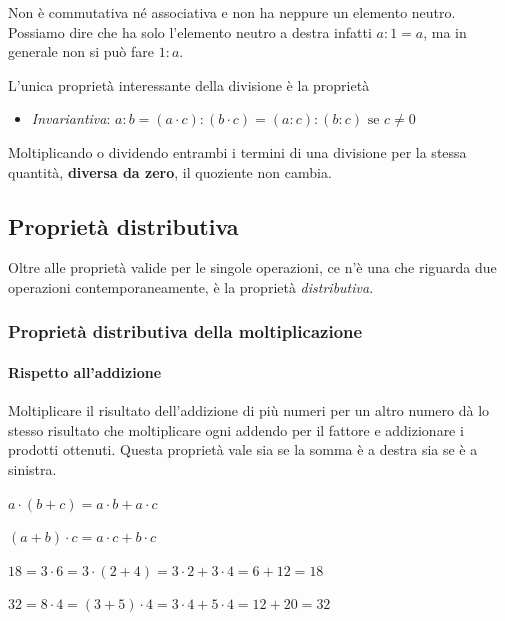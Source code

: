 Non è commutativa né associativa e non ha neppure un elemento neutro.
Possiamo dire che ha solo l'elemento neutro a destra infatti \(a : 1 = a\), 
ma in generale non si può fare \(1 : a\).

L'unica proprietà interessante della divisione è la proprietà
\begin{itemize} [noitemsep]
 \item \emph{Invariantiva}: 
  \(a : b = (a \cdot c) : (b \cdot c) = (a : c) : (b : c) \text{ se } c \neq 
0\)
\end{itemize}

\begin{definizione}
Moltiplicando o dividendo entrambi i termini di una divisione per 
la stessa quantità, \textbf{diversa da zero}, il quoziente non  cambia.
\end{definizione}

\subsection{Proprietà distributiva}

Oltre alle proprietà valide per le singole operazioni, ce n'è una che 
riguarda due operazioni contemporaneamente, è la proprietà 
\emph{distributiva}.

\subsubsection{Proprietà distributiva della moltiplicazione}

\paragraph{Rispetto all'addizione}
Moltiplicare il risultato dell'addizione di più numeri per un altro numero 
dà lo stesso risultato che moltiplicare ogni addendo per il fattore e 
addizionare i prodotti ottenuti. Questa proprietà vale sia se la somma è a 
destra sia se è a sinistra.


\vspace{.5em}
\begin{minipage}{.38\textwidth}
 \(a \cdot (b+c) = a \cdot b + a \cdot c\)
 
 \((a+b) \cdot c = a \cdot c + b \cdot c\)
\end{minipage}
\hfill
\begin{minipage}{.58\textwidth}
 \(18 = 3 \cdot 6 = 3 \cdot(2+4) = 3 \cdot 2 + 3 \cdot 4 = 6 + 12 = 18\)
 
 \(32 = 8 \cdot 4 = (3+5) \cdot 4 = 3 \cdot 4 + 5 \cdot 4 = 12 + 20 = 32\)
\end{minipage}

